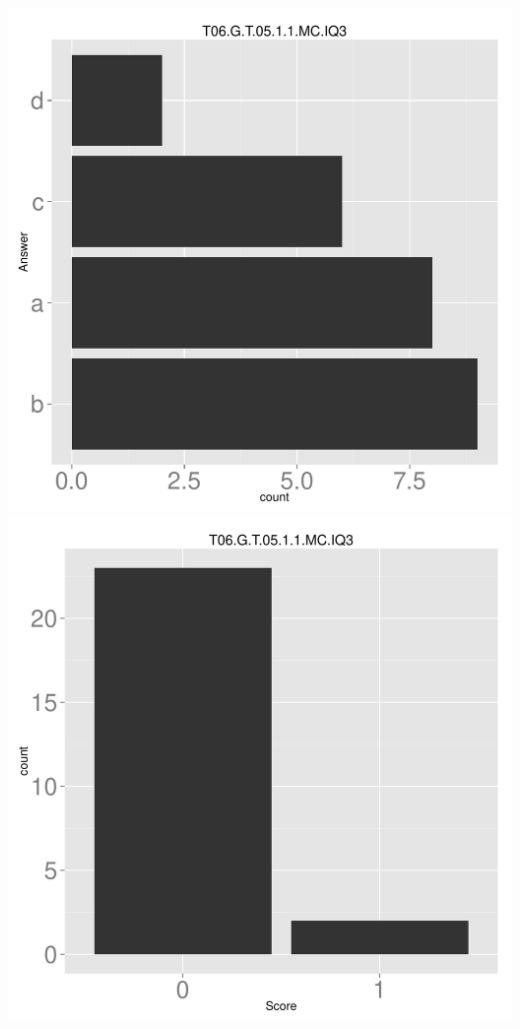 \documentclass[12pt,nohyper]{tufte-handout}\usepackage[]{graphicx}\usepackage[]{color}
\begin{document}
\begin{center} \includegraphics[width=.45\linewidth]{Topic06_82_answer} \includegraphics[width=.45\linewidth]{Topic06_82_score} \end{center} 
\end{document}
